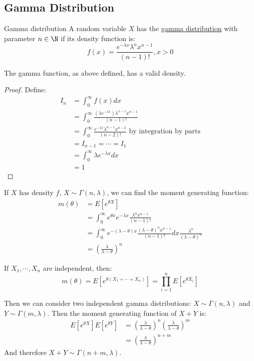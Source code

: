 \documentclass[../Main.tex]{subfiles}
\begin{document}
\subsection{Gamma Distribution}
\begin{definition}{Gamma distribution}
    A random variable $X$ has the \underline{gamma distribution} with parameter $n \in \N$ if its density function is:
    \begin{equation*}
        f(x) = \frac{e^{-\lambda x} \lambda^n x^{n-1}}{(n-1)!}, x > 0
    \end{equation*}
\end{definition}
\begin{proposition}
    The gamma function, as above defined, has a valid density.
    \label{propGammaDensityValid}
\end{proposition}
\begin{proof}
    Define:
    \begin{align*}
        I_n &= \int_0^\infty f(x) dx \\
        &= \int_0^\infty \frac{\left(\lambda e^{-\lambda x}\right)\lambda^{x-1} x^{n-1}}{(n-1)!} \\
        &= \int_0^\infty \frac{e^{-\lambda x}\lambda^{n-1} x^{n-2}}{(n-2)!} \text{ by integration by parts} \\
        &= I_{n-1} = \cdots = I_1 \\
        &= \int_0^\infty \lambda e^{-\lambda x} dx \\
        &= 1
    \end{align*}
\end{proof}
If $X$ has density $f$, $X \sim \Gamma(n, \lambda)$, we can find the moment generating function:
\begin{align*}
    m(\theta) &= E[e^{\theta X}] \\
    &= \int_0^\infty e^{\theta x} e^{-\lambda x} \frac{\lambda^n x^{n-1}}{(n-1)!} \\
    &= \int_0^\infty e^{-(\lambda - \theta)x} \frac{(\lambda - \theta)^n x^{n-1}}{(n-1)!} dx \frac{\lambda^n}{(\lambda - \theta)^n} \\
    &= \left(\frac{\lambda}{\lambda - \theta}\right)^n
\end{align*}
\begin{proposition}
    If $X_1, \cdots, X_n$ are independent, then:
    \begin{equation*}
        m(\theta) = E[e^{\theta (X_1 + \cdots + X_n)}] = \prod_{i=1}^n E[e^{\theta X_i}]
    \end{equation*}
    \label{propMGFFactorise}
\end{proposition}
Then we can consider two independent gamma distributions: $X \sim \Gamma(n, \lambda)$ and $Y \sim \Gamma(m, \lambda)$. Then the moment generating function of $X+Y$ is:
\begin{align*}
    E[e^{\theta X}] E[e^{\theta Y}] &= \left(\frac{\lambda}{\lambda - \theta}\right)^n \left(\frac{\lambda}{\lambda - \theta}\right)^m \\
    &= \left(\frac{\lambda}{\lambda - \theta}\right)^{n+m}
\end{align*}
And therefore $X + Y \sim \Gamma(n+m, \lambda)$.
\end{document}
